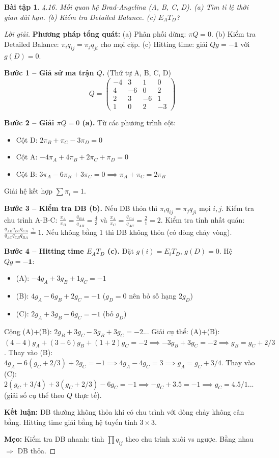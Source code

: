 \documentclass[8pt,a4paper]{article}
\newtheorem{exercise}{Bài tập}
\newenvironment{solution}{\begin{proof}[Lời giải]}{\end{proof}}
\begin{document}
\begin{exercise}
4.16. Mối quan hệ Brad-Angelina (A, B, C, D). 
(a) Tìm tỉ lệ thời gian dài hạn. (b) Kiểm tra Detailed Balance. (c) $E_A T_D$?
\end{exercise}
\begin{solution}
\textbf{Phương pháp tổng quát:} (a) Phân phối dừng: $\pi Q = 0$. (b) Kiểm tra Detailed Balance: $\pi_i q_{ij} = \pi_j q_{ji}$ cho mọi cặp. (c) Hitting time: giải $Qg = -\mathbf{1}$ với $g(D)=0$.

\textbf{Bước 1 -- Giả sử ma trận $Q$.} (Thứ tự A, B, C, D)
\[
Q = \begin{pmatrix}
-4 & 3 & 1 & 0 \\
4 & -6 & 0 & 2 \\
2 & 3 & -6 & 1 \\
1 & 0 & 2 & -3
\end{pmatrix}
\]

\textbf{Bước 2 -- Giải $\pi Q = 0$ (a).} Từ các phương trình cột:
\begin{itemize}[nosep]
\item Cột D: $2\pi_B + \pi_C - 3\pi_D = 0$
\item Cột A: $-4\pi_A + 4\pi_B + 2\pi_C + \pi_D = 0$
\item Cột B: $3\pi_A - 6\pi_B + 3\pi_C = 0 \implies \pi_A + \pi_C = 2\pi_B$
\end{itemize}
Giải hệ kết hợp $\sum \pi_i = 1$.

\textbf{Bước 3 -- Kiểm tra DB (b).} Nếu DB thỏa thì $\pi_i q_{ij} = \pi_j q_{ji}$ mọi $i,j$.
Kiểm tra chu trình A-B-C: $\frac{\pi_A}{\pi_B} = \frac{q_{BA}}{q_{AB}} = \frac{4}{3}$ và $\frac{\pi_A}{\pi_C} = \frac{q_{CA}}{q_{AC}} = \frac{2}{1} = 2$.
Kiểm tra tính nhất quán: $\frac{q_{AB}q_{BC}q_{CA}}{q_{AC}q_{CB}q_{BA}} \stackrel{?}{=} 1$. Nếu không bằng 1 thì DB không thỏa (có dòng chảy vòng).

\textbf{Bước 4 -- Hitting time $E_A T_D$ (c).} Đặt $g(i) = E_i T_D$, $g(D) = 0$. Hệ $Qg = -\mathbf{1}$:
\begin{itemize}[nosep]
\item (A): $-4g_A + 3g_B + 1g_C = -1$
\item (B): $4g_A - 6g_B + 2g_C = -1$ \quad ($g_D = 0$ nên bỏ số hạng $2g_D$)
\item (C): $2g_A + 3g_B - 6g_C = -1$ \quad (bỏ $g_D$)
\end{itemize}
Cộng (A)+(B): $2g_B + 3g_C - 3g_B + 3g_C = -2$... Giải cụ thể:
(A)+(B): $(4-4)g_A + (3-6)g_B + (1+2)g_C = -2 \implies -3g_B + 3g_C = -2 \implies g_B = g_C + 2/3$.
Thay vào (B): $4g_A - 6(g_C+2/3) + 2g_C = -1 \implies 4g_A - 4g_C = 3 \implies g_A = g_C + 3/4$.
Thay vào (C): $2(g_C + 3/4) + 3(g_C+2/3) - 6g_C = -1 \implies -g_C + 3.5 = -1 \implies g_C = 4.5/1$... (giải số cụ thể theo $Q$ thực tế).

\textbf{Kết luận:} DB thường không thỏa khi có chu trình với dòng chảy không cân bằng. Hitting time giải bằng hệ tuyến tính $3 \times 3$.

\textbf{Mẹo:} Kiểm tra DB nhanh: tính $\prod q_{ij}$ theo chu trình xuôi vs ngược. Bằng nhau $\Rightarrow$ DB thỏa.
\end{solution}
\end{document}
